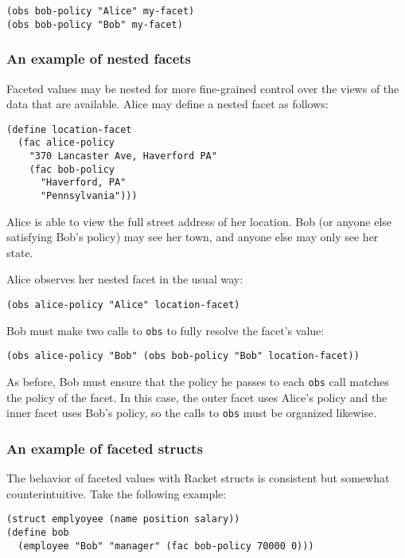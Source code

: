 \documentclass{article}
\begin{document}
\begin{lstlisting}
(obs bob-policy "Alice" my-facet)
(obs bob-policy "Bob" my-facet)
\end{lstlisting}

\subsubsection{An example of nested facets}
Faceted values may be nested for more fine-grained control over the views of the data that are available. Alice may define a nested facet as follows:

\begin{lstlisting}
(define location-facet
  (fac alice-policy
    "370 Lancaster Ave, Haverford PA"
    (fac bob-policy
      "Haverford, PA"
      "Pennsylvania")))
\end{lstlisting}

Alice is able to view the full street address of her location. Bob (or anyone else satisfying Bob's policy) may see her town, and anyone else may only see her state.

Alice observes her nested facet in the usual way:

\begin{lstlisting}
(obs alice-policy "Alice" location-facet)
\end{lstlisting}

Bob must make two calls to \texttt{obs} to fully resolve the facet's value:

\begin{lstlisting}
(obs alice-policy "Bob" (obs bob-policy "Bob" location-facet))
\end{lstlisting}

As before, Bob must ensure that the policy he passes to each \texttt{obs} call matches the policy of the facet. In this case, the outer facet uses Alice's policy and the inner facet uses Bob's policy, so the calls to \texttt{obs} must be organized likewise.

\subsubsection{An example of faceted structs}
The behavior of faceted values with Racket structs is consistent but somewhat counterintuitive. Take the following example:

\begin{lstlisting}
(struct emplyoyee (name position salary))
(define bob 
  (employee "Bob" "manager" (fac bob-policy 70000 0)))
\end{lstlisting}
\end{document}
